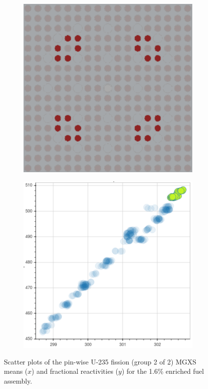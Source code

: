 \begin{figure}[h!]
\begin{subfigure}{0.45\textwidth}
  \caption{}
  \label{fig:chap10-fiss-mean-pcm-mgxs-2}
\end{subfigure}
\begin{subfigure}{0.45\textwidth}
  \centering
  \includegraphics[width=0.9\linewidth]{figures/unsupervised/features/assm-16/u235-fiss/mean-pcm/geometry-3}
  \caption{}
  \label{fig:chap10-fiss-mean-pcm-geom-3}
\end{subfigure}%
\begin{subfigure}{0.45\textwidth}
  \centering
  \includegraphics[width=0.9\linewidth]{figures/unsupervised/features/assm-16/u235-fiss/mean-pcm/mgxs-3}
  \caption{}
  \label{fig:chap10-fiss-mean-pcm-mgxs-3}
\end{subfigure}
\caption[Clustering of U-235 fission MGXS fractional reactivities]{Scatter plots of the pin-wise U-235 fission (group 2 of 2) \ac{MGXS} means ($x$) and fractional reactivities ($y$) for the 1.6\% enriched fuel assembly.}
\label{fig:chap10-fiss-mean-pcm}
\end{figure}

